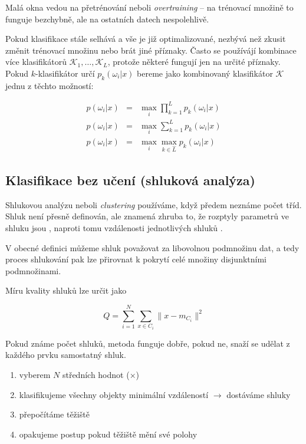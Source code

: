 Malá okna vedou na přetrénování neboli {\em overtraining} -- na trénovací množině to funguje bezchybně, ale na ostatních
datech nespolehlivě.


Pokud klasifikace stále selhává a vše je již optimalizované, nezbývá než zkusit změnit trénovací množinu nebo
brát jiné příznaky. Často se používájí kombinace více klasifikátorů $\mathcal{K}_1,\dots,\mathcal{K}_L$, protože 
některé fungují jen na určité příznaky. Pokud $k$-klasifikátor určí $p_k(\omega_i|x)$ bereme jako kombinovaný
klasifikátor $\mathcal{K}$ jednu z těchto možností:

\begin{eqnarray}
p(\omega_i|x)&=&\max\limits_i\prod\limits_{k=1}^L p_k(\omega_i|x)\\
p(\omega_i|x)&=&\max\limits_i \sum\limits_{k=1}^L p_k(\omega_i|x)\\
p(\omega_i|x)&=&\max\limits_i \max\limits_{k\in\hat{L}} p_k(\omega_i|x)
\end{eqnarray}

\subsection{Klasifikace bez učení (shluková analýza)}

Shlukovou analýzu neboli {\em clustering} používáme, když předem  neznáme počet tříd. Shluk není přesně definován,
ale znamená zhruba to, že rozptyly parametrů ve shluku jsou , naproti tomu vzdálenosti jednotlivých shluků
. 

V obecné definici můžeme shluk považovat za libovolnou podmnožinu dat, a tedy proces shlukování pak lze přirovnat k pokrytí
celé množiny disjunktními podmnožinami.

Míru kvality shluků lze určit jako

\begin{equation}
Q=\sum\limits_{i=1}^N\sum\limits_{x\in C_i}\|x-m_{C_i}\|^2
\end{equation}

Pokud známe počet shluků, metoda funguje dobře, pokud ne, snaží se udělat z každého prvku samostatný shluk.

\begin{enumerate}
\item vyberem $N$ středních hodnot ($\times$)
\item klasifikujeme všechny objekty minimální vzdáleností $\rightarrow$ dostáváme shluky
\item přepočítáme těžiště
\item opakujeme postup pokud těžiště mění své polohy 
\end{enumerate}

